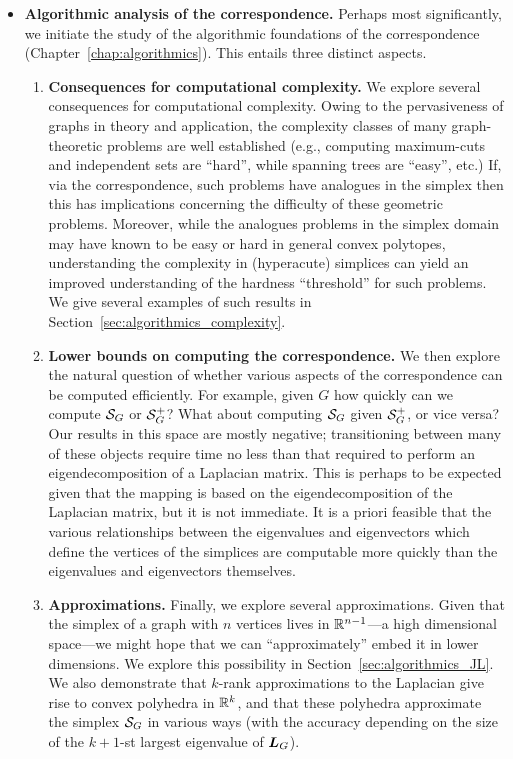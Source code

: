 \begin{itemize}
	\item {\bf Algorithmic analysis of the correspondence.} Perhaps most significantly, we initiate the study of the algorithmic foundations of the correspondence (Chapter~\ref{chap:algorithmics}). This entails three distinct aspects. 
	\begin{enumerate}
		\item {\bf Consequences for computational complexity.}	We explore several consequences for computational  complexity.  Owing to the pervasiveness of graphs in theory and application, the complexity classes of many graph-theoretic problems are  well established (e.g., computing maximum-cuts and independent sets are ``hard'', while spanning trees are ``easy'', etc.) If, via the correspondence, such problems have analogues in the simplex then this has implications concerning the difficulty of these geometric problems. Moreover, while the analogues problems in the simplex domain may have known to be easy or hard  in general convex polytopes, understanding the complexity in (hyperacute) simplices can yield an improved understanding of the hardness ``threshold'' for such problems. We give several examples of such results in Section~\ref{sec:algorithmics_complexity}. 
		\item {\bf Lower bounds on computing the correspondence.} We then explore the natural question of whether various aspects of the correspondence can be computed efficiently. For example, given $G$ how quickly can we compute $\mathcal{S}_G$ or $\mathcal{S}_G^+$? What about computing $\mathcal{S}_G$ given $\mathcal{S}_G^+$, or vice  versa? Our results in this  space are mostly negative; transitioning between many of these objects require time no less than that required to perform an eigendecomposition of a Laplacian matrix. 
		This is perhaps to be expected given that the mapping is based on the eigendecomposition of the Laplacian matrix, but it is not immediate.  It is a priori  feasible that the various relationships between the eigenvalues and eigenvectors which define the vertices of  the simplices are computable more quickly than the eigenvalues and eigenvectors  themselves. 
		\item {\bf Approximations.} Finally, we explore several approximations. Given that  the simplex of a graph with $n$ vertices lives in $\mathbb{R}^{n-1}$---a high dimensional  space---we might hope that we can ``approximately'' embed it  in  lower dimensions. We explore this possibility in Section~\ref{sec:algorithmics_JL}. We also demonstrate that $k$-rank approximations  to  the Laplacian give rise to convex polyhedra in $\mathbb{R}^k$, and that these polyhedra approximate the simplex $\mathcal{S}_G$ in various ways (with the accuracy depending on the  size of the $k+1$-st  largest  eigenvalue of $\vb*{L}_G$). 
	\end{enumerate}

\end{itemize}

